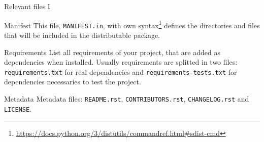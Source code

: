 \begin{frame}{Relevant files I}
    \begin{block}{Manifest}
        This file, \texttt{MANIFEST.in}, with own syntax\footnote[1]{\href{https://docs.python.org/3/distutils/commandref.html#sdist-cmd}{https://docs.python.org/3/distutils/commandref.html#sdist-cmd}} defines the directories and files that will be included in the distributable package.
    \end{block}
    \pause
    \begin{block}{Requirements}
        List all requirements of your project, that are added as dependencies when installed. Usually requirements are splitted in two files: \texttt{requirements.txt} for real dependencies and \texttt{requirements-tests.txt} for dependencies necessaries to test the project.
    \end{block}
    \pause
    \begin{block}{Metadata}
        Metadata files: \texttt{README.rst}, \texttt{CONTRIBUTORS.rst}, \texttt{CHANGELOG.rst} and \texttt{LICENSE}.
    \end{block}
\end{frame}

